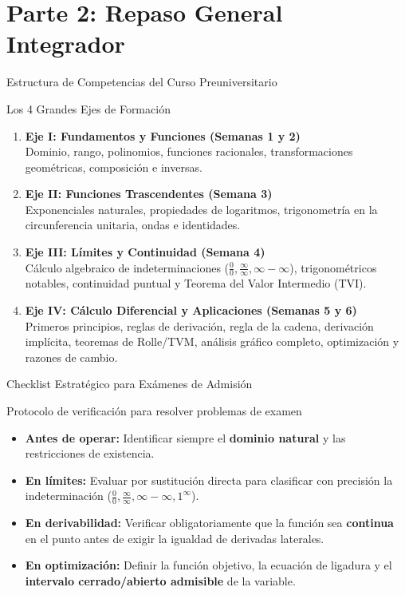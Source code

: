 \documentclass[aspectratio=169]{beamer}
\begin{document}
\section{Parte 2: Repaso General Integrador}


\begin{frame}{Estructura de Competencias del Curso Preuniversitario}
  \begin{block}{Los 4 Grandes Ejes de Formación}
    \begin{enumerate}
      \item \textbf{Eje I: Fundamentos y Funciones (Semanas 1 y 2)} \\
            Dominio, rango, polinomios, funciones racionales, transformaciones geométricas, composición e inversas.
      \item \textbf{Eje II: Funciones Trascendentes (Semana 3)} \\
            Exponenciales naturales, propiedades de logaritmos, trigonometría en la circunferencia unitaria, ondas e identidades.
      \item \textbf{Eje III: Límites y Continuidad (Semana 4)} \\
            Cálculo algebraico de indeterminaciones ($\frac{0}{0}, \frac{\infty}{\infty}, \infty-\infty$), trigonométricos notables, continuidad puntual y Teorema del Valor Intermedio (TVI).
      \item \textbf{Eje IV: Cálculo Diferencial y Aplicaciones (Semanas 5 y 6)} \\
            Primeros principios, reglas de derivación, regla de la cadena, derivación implícita, teoremas de Rolle/TVM, análisis gráfico completo, optimización y razones de cambio.
    \end{enumerate}
  \end{block}
\end{frame}

\begin{frame}{Checklist Estratégico para Exámenes de Admisión}
  \begin{alertblock}{Protocolo de verificación para resolver problemas de examen}
    \begin{itemize}
      \item \textbf{Antes de operar:} Identificar siempre el \textbf{dominio natural} y las restricciones de existencia.
      \item \textbf{En límites:} Evaluar por sustitución directa para clasificar con precisión la indeterminación ($\frac{0}{0}, \frac{\infty}{\infty}, \infty-\infty, 1^\infty$).
      \item \textbf{En derivabilidad:} Verificar obligatoriamente que la función sea \textbf{continua} en el punto antes de exigir la igualdad de derivadas laterales.
      \item \textbf{En optimización:} Definir la función objetivo, la ecuación de ligadura y el \textbf{intervalo cerrado/abierto admisible} de la variable.
    \end{itemize}
  \end{alertblock}
\end{frame}
\end{document}
